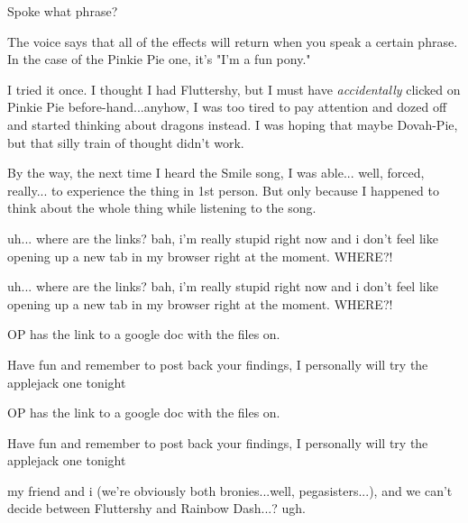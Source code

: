 \documentclass[ebook,12pt,oneside,openany]{memoir}
\newcommand{\mytexttilde}{\raisebox{0.5ex}{\texttildelow}}
\begin{document}
\begin{tcolorbox}[title=Shining Wing,colback=blue!5!white,colframe=blue!75!black,coltitle=white]
\begin{tcolorbox}[title=suclearnub]
\par{Spoke what phrase?}
\end{tcolorbox}
 \par{The voice says that all of the effects will return when you speak a certain phrase. In the case of the Pinkie Pie one, it's "I'm a fun pony."}
\end{tcolorbox}
\begin{tcolorbox}[title=GoneForeverBye]
\par{I tried it once. I thought I had Fluttershy, but I must have \textit{accidentally} clicked on Pinkie Pie before-hand...anyhow, I was too tired to pay attention and dozed off and started thinking about dragons instead. I was hoping that maybe Dovah-Pie, but that silly train of thought didn't work.}
\newline{}
\par{By the way, the next time I heard the Smile song, I was able... well, forced, really... to experience the thing in 1st person. But only because I happened to think about the whole thing while listening to the song.}
\end{tcolorbox}
\begin{tcolorbox}[title=AzuelFox102]
\par{uh... where are the links? bah, i'm really stupid right now and i don't feel like opening up a new tab in my browser right at the moment. WHERE?!}
\end{tcolorbox}
\begin{tcolorbox}[title=\mytexttilde{}Chaotic Parsley\mytexttilde{},colback=cyan!5!white,colframe=cyan!75!black,coltitle=white]
\begin{tcolorbox}[title=AzuelFox102]
\par{uh... where are the links? bah, i'm really stupid right now and i don't feel like opening up a new tab in my browser right at the moment. WHERE?!}
\end{tcolorbox}
\par{OP has the link to a google doc with the files on.}
\newline{}
\par{Have fun and remember to post back your findings, I personally will try the applejack one tonight }
\end{tcolorbox}
\begin{tcolorbox}[title=AzuelFox102]
\begin{tcolorbox}[title=Parsleyshy]
\par{OP has the link to a google doc with the files on.}
\newline{}
\par{Have fun and remember to post back your findings, I personally will try the applejack one tonight }
\end{tcolorbox}
\par{my friend and i (we're obviously both bronies...well, pegasisters...), and we can't decide between Fluttershy and Rainbow Dash...? ugh.}
\end{tcolorbox}
\end{document}
